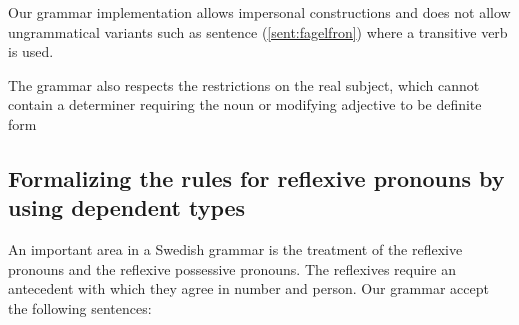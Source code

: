 \documentclass[10pt, a4paper]{article}
\begin{document}
Our grammar implementation allows impersonal constructions 
and does not allow ungrammatical variants such as sentence
(\ref{sent:fagelfron}) where a transitive verb is used.


The grammar also respects the restrictions on the real subject, which cannot
contain a determiner requiring the noun or modifying adjective to be definite form \cite{Cooper}
\label{sent:dumfagel}
 
\subsection{Formalizing the rules for reflexive pronouns by using dependent types}
\label{sec:reflexives}
An important area in a Swedish grammar is the treatment of the reflexive pronouns and
the reflexive possessive pronouns.
The reflexives require an antecedent with which they agree in
number and person.
Our grammar accept the following sentences:
\end{document}
